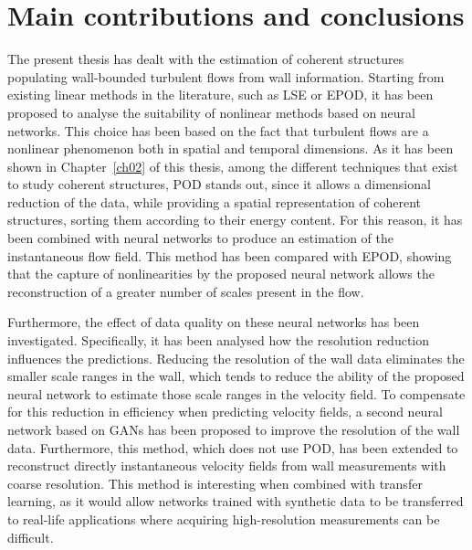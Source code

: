 \chapter{Main contributions and conclusions}\label{ch04}
%

The present thesis has dealt with the estimation of coherent structures populating wall-bounded turbulent flows from wall information.
Starting from existing linear methods in the literature, such as LSE or EPOD, it has been proposed to analyse the suitability of nonlinear methods based on neural networks.
This choice has been based on the fact that turbulent flows are a nonlinear phenomenon both in spatial and temporal dimensions.
As it has been shown in Chapter~\ref{ch02} of this thesis, among the different techniques that exist to study coherent structures, POD stands out, since it allows a dimensional reduction of the data, while providing a spatial representation of coherent structures, sorting them according to their energy content.
For this reason, it has been combined with neural networks to produce an estimation of the instantaneous flow field.
This method has been compared with EPOD, showing that the capture of nonlinearities by the proposed neural network allows the reconstruction of a greater number of scales present in the flow.

Furthermore, the effect of data quality on these neural networks has been investigated.
Specifically, it has been analysed how the resolution reduction influences the predictions.
Reducing the resolution of the wall data eliminates the smaller scale ranges in the wall, which tends to reduce the ability of the proposed neural network to estimate those scale ranges in the velocity field.
To compensate for this reduction in efficiency when predicting velocity fields, a second neural network based on GANs has been proposed to improve the resolution of the wall data.
Furthermore, this method, which does not use POD, has been extended to reconstruct directly instantaneous velocity fields from wall measurements with coarse resolution.
This method is interesting when combined with transfer learning, as it would allow networks trained with synthetic data to be transferred to real-life applications where acquiring high-resolution measurements can be difficult.

